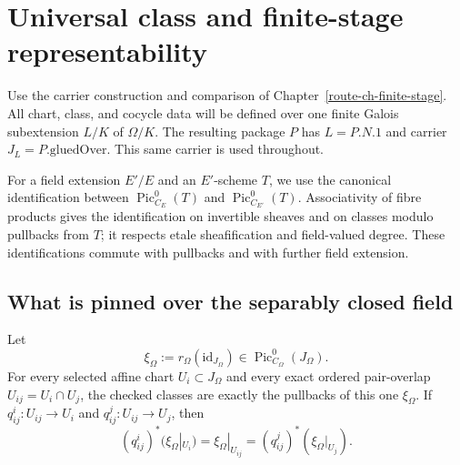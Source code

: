 \chapter{Universal class and finite-stage representability}
\label{route-ch-universal}

Use the carrier construction and comparison of
Chapter~\ref{route-ch-finite-stage}.  All chart, class, and cocycle data will
be defined over one finite Galois subextension \(L/K\) of \(\Omega/K\).
The resulting package \(P\) has \(L=P.N.1\) and carrier
\(J_L=P.\mathrm{gluedOver}\).  This same carrier is used throughout.

For a field extension \(E'/E\) and an \(E'\)-scheme \(T\), we use the
canonical identification between \(\operatorname{Pic}^0_{C_E}(T)\) and
\(\operatorname{Pic}^0_{C_{E'}}(T)\).  Associativity of fibre products gives
the identification on invertible sheaves and on classes modulo pullbacks
from \(T\); it respects etale sheafification and field-valued degree.
These identifications commute with pullbacks and with further field
extension.

\section{What is pinned over the separably closed field}

\begin{theorem}
  \label{route-thm-sepclosed-universal-class}
  \leanok

  Let
  \[
    \xi_\Omega:=r_\Omega(\mathrm{id}_{J_\Omega})
       \in\operatorname{Pic}^0_{C_\Omega}(J_\Omega).
  \]
  For every selected affine chart \(U_i\subset J_\Omega\) and every exact
  ordered pair-overlap \(U_{ij}=U_i\cap U_j\), the checked classes are exactly
  the pullbacks of this one \(\xi_\Omega\).  If
  \(q^i_{ij}:U_{ij}\to U_i\) and \(q^j_{ij}:U_{ij}\to U_j\), then
  \[
    (q^i_{ij})^*(\xi_\Omega|_{U_i})
      =\xi_\Omega|_{U_{ij}}
      =(q^j_{ij})^*(\xi_\Omega|_{U_j}).
  \]
\end{theorem}

